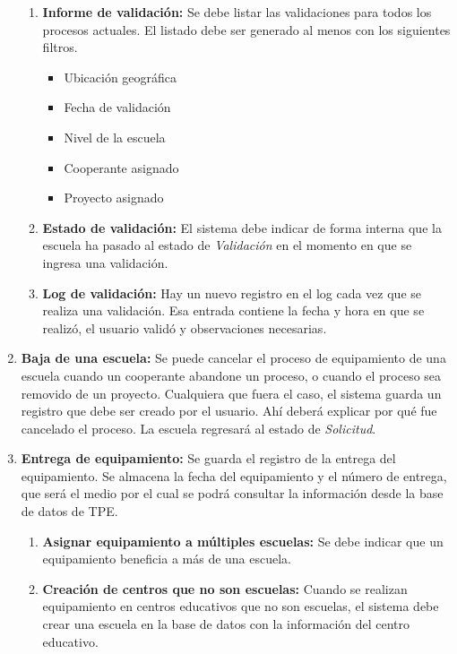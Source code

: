 \documentclass[11pt]{report}
\newcommand{\requisito}[2]{\textbf{#1:} #2}
\begin{document}
\begin{enumerate}[leftmargin=0.8cm]
\begin{enumerate}
			\item \requisito{Informe de validación}{Se debe listar las validaciones para todos los procesos actuales. El listado debe ser generado al menos con los siguientes filtros.
				\begin{itemize}
					\item Ubicación geográfica
					\item Fecha de validación
					\item Nivel de la escuela
					\item Cooperante asignado
					\item Proyecto asignado
				\end{itemize}
			}
			\item \requisito{Estado de validación}{El sistema debe indicar de forma interna que la escuela ha pasado al estado de \textit{Validación} en el momento en que se ingresa una validación.}
			\item \requisito{Log de validación}{Hay un nuevo registro en el log cada vez que se realiza una validación. Esa entrada contiene la  fecha y hora en que se realizó, el usuario validó y observaciones necesarias.}
		\end{enumerate}
		
		\item \requisito{Baja de una escuela}{Se puede cancelar el proceso de equipamiento de una escuela cuando un cooperante abandone un proceso, o cuando el proceso sea removido de un proyecto. Cualquiera que fuera el caso, el sistema guarda un registro que debe ser creado por el usuario. Ahí deberá explicar por qué fue cancelado el proceso. La escuela regresará al estado de \textit{Solicitud}.}
		
		\item \requisito{Entrega de equipamiento}{Se guarda el registro de la entrega del equipamiento. Se almacena la fecha del equipamiento y el número de entrega, que será el medio por el cual se podrá consultar la información desde la base de datos de TPE.}
		\begin{enumerate}
			\item \requisito{Asignar equipamiento a múltiples escuelas}{Se debe indicar que un equipamiento beneficia a más de una escuela.}
			\item \requisito{Creación de centros que no son escuelas}{Cuando se realizan equipamiento en centros educativos que no son escuelas, el sistema debe crear una escuela en la base de datos con la información del centro educativo.}
		\end{enumerate}
		

\end{enumerate}
\end{document}
